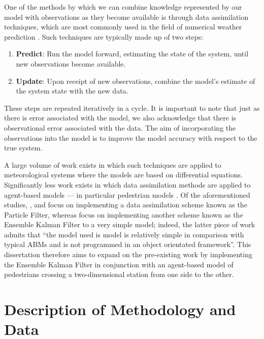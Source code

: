 \documentclass[12pt, twoside, a4paper]{article}
\begin{document}
One of the methods by which we can combine knowledge represented by our model
with observations as they become available is through data assimilation
techniques, which are most commonly used in the field of numerical weather
prediction \citep{kalnay2003atmospheric}.
Such techniques are typically made up of two steps:
\begin{enumerate}
    \item \textbf{Predict}: Run the model forward, estimating the state of the
        system, until new observations become available.
    \item \textbf{Update}: Upon receipt of new observations, combine the model's
        estimate of the system state with the new data.
\end{enumerate}
These steps are repeated iteratively in a cycle.
It is important to note that just as there is error associated with the model,
we also acknowledge that there is observational error associated with the data.
The aim of incorporating the observations into the model is to improve the model
accuracy with respect to the true system.

A large volume of work exists in which such techniques are applied to
meteorological systems where the models are based on differential equations.
Significantly less work exists in which data assimilation methods are applied to
agent-based models \citep{wang2017random} --- in particular pedestrian models
\citep{wang2013data, rai2013behavior, wang2015data, ward2016dynamic}.
Of the aforementioned studies, \citet{wang2013data}, \citet{rai2013behavior} and
\citet{wang2015data} focus on implementing a data assimilation scheme known as
the Particle Filter, whereas \citet{ward2016dynamic} focus on implementing
another scheme known as the Ensemble Kalman Filter to a very simple model;
indeed, the latter piece of work admits that ``the model used is model is
relatively simple in comparison with typical ABMs and is not programmed in an
object orientated framework''.
This dissertation therefore aims to expand on the pre-existing work by
implementing the Ensemble Kalman Filter in conjunction with an agent-based model
of pedestrians crossing a two-dimensional station from one side to the other.

\section{Description of Methodology and Data}\label{sec:method_descr}

\end{document}
